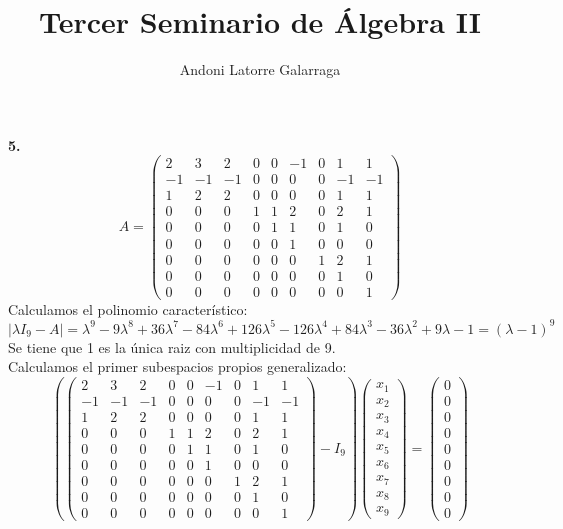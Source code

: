 \documentclass{article}
\title{Tercer Seminario de Álgebra II}
\author{Andoni Latorre Galarraga}
\date{}
\begin{document}
\maketitle
{}
\noindent\textbf{5.}
$$
A=
\left(\begin{array}{ccccccccc}
     2 & 3 & 2 & 0 & 0 &-1 & 0 & 1 & 1\\
    -1 &-1 &-1 & 0 & 0 & 0 & 0 &-1 &-1\\
     1 & 2 & 2 & 0 & 0 & 0 & 0 & 1 & 1\\
     0 & 0 & 0 & 1 & 1 & 2 & 0 & 2 & 1\\
     0 & 0 & 0 & 0 & 1 & 1 & 0 & 1 & 0\\
     0 & 0 & 0 & 0 & 0 & 1 & 0 & 0 & 0\\
     0 & 0 & 0 & 0 & 0 & 0 & 1 & 2 & 1\\
     0 & 0 & 0 & 0 & 0 & 0 & 0 & 1 & 0\\
     0 & 0 & 0 & 0 & 0 & 0 & 0 & 0 & 1
\end{array}\right)
$$
Calculamos el polinomio característico:
$$
|\lambda I_9 -A|=
\lambda^9-9\lambda^8+36\lambda^7-84\lambda^6+126\lambda^5-126\lambda^4+84\lambda^3-36\lambda^2+9\lambda-1=(\lambda-1)^9
$$
Se tiene que 1 es la única raiz con multiplicidad de 9.\\
Calculamos el primer subespacios propios generalizado:
$$
\left(
\left(\begin{array}{ccccccccc}
     2 & 3 & 2 & 0 & 0 &-1 & 0 & 1 & 1\\
    -1 &-1 &-1 & 0 & 0 & 0 & 0 &-1 &-1\\
     1 & 2 & 2 & 0 & 0 & 0 & 0 & 1 & 1\\
     0 & 0 & 0 & 1 & 1 & 2 & 0 & 2 & 1\\
     0 & 0 & 0 & 0 & 1 & 1 & 0 & 1 & 0\\
     0 & 0 & 0 & 0 & 0 & 1 & 0 & 0 & 0\\
     0 & 0 & 0 & 0 & 0 & 0 & 1 & 2 & 1\\
     0 & 0 & 0 & 0 & 0 & 0 & 0 & 1 & 0\\
     0 & 0 & 0 & 0 & 0 & 0 & 0 & 0 & 1
\end{array}\right)-I_9
\right)
\left(\begin{array}{c}
    x_1\\
    x_2 \\
    x_3 \\
    x_4 \\
    x_5 \\
    x_6 \\
    x_7 \\
    x_8 \\
    x_9
\end{array}\right)
=
\left(\begin{array}{c}
    0\\
    0 \\
    0 \\
    0 \\
    0 \\
    0 \\
    0 \\
    0 \\
    0
\end{array}\right)
$$
\end{document}
